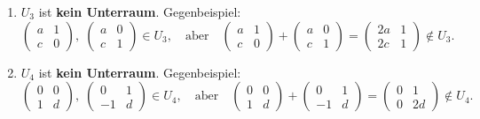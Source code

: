 \documentclass[a4paper,12pt]{article}
\begin{document}
\begin{enumerate}[label=\alph*)]
\item $U_3$ ist \textbf{kein Unterraum}. Gegenbeispiel:
\[
  \begin{pmatrix}a & 1 \\ c & 0\end{pmatrix},\;
  \begin{pmatrix}a & 0 \\ c & 1\end{pmatrix} \in U_3,
  \quad\text{aber}\quad
  \begin{pmatrix}a & 1 \\ c & 0\end{pmatrix}
  + \begin{pmatrix}a & 0 \\ c & 1\end{pmatrix}
  = \begin{pmatrix}2a & 1 \\ 2c & 1\end{pmatrix} \notin U_3.
\]

\item $U_4$ ist \textbf{kein Unterraum}. Gegenbeispiel:
\[
  \begin{pmatrix}0 & 0 \\ 1 & d\end{pmatrix},\;
  \begin{pmatrix}0 & 1 \\ -1 & d\end{pmatrix} \in U_4,
  \quad\text{aber}\quad
  \begin{pmatrix}0 & 0 \\ 1 & d\end{pmatrix}
  + \begin{pmatrix}0 & 1 \\ -1 & d\end{pmatrix}
  = \begin{pmatrix}0 & 1 \\ 0 & 2d\end{pmatrix} \notin U_4.
\]

\end{enumerate}
\end{document}
